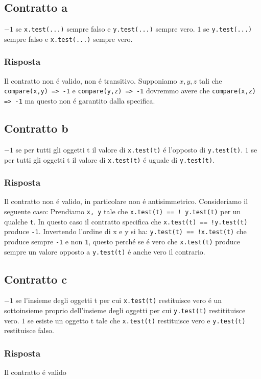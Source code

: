 \documentclass[11pt]{article}
\begin{document}
\subsection{Contratto a}
\label{sec:org3b5a414}
\(-1\) se \texttt{x.test(...)} sempre falso e \texttt{y.test(...)} sempre vero.
\(1\) se \texttt{y.test(...)} sempre falso e \texttt{x.test(...)} sempre vero.
\subsubsection{Risposta}
\label{sec:org29077a0}
Il contratto non é valido, non é transitivo.
Supponiamo \(x,y,z\) tali che \texttt{compare(x,y) => -1} e \texttt{compare(y,z) => -1} dovremmo avere che \texttt{compare(x,z) => -1} ma questo non é garantito dalla specifica.
\subsection{Contratto b}
\label{sec:org5584f2e}
\(-1\) se per tutti gli oggetti t il valore di  \texttt{x.test(t)} é l'opposto di \texttt{y.test(t)}.
\(1\) se per tutti gli oggetti t il valore di  \texttt{x.test(t)} é uguale di \texttt{y.test(t)}.
\subsubsection{Risposta}
\label{sec:orgf2d2477}
Il contratto non é valido, in particolare non é antisimmetrico.
Consideriamo il seguente caso:
Prendiamo \texttt{x, y} tale che \texttt{x.test(t) == ! y.test(t)} per un qualche \texttt{t}.
In questo caso il contratto specifica che \texttt{x.test(t) == !y.test(t)} produce \texttt{-1}.
Invertendo l'ordine di x e y si ha:
\texttt{y.test(t) == !x.test(t)} che produce sempre \texttt{-1} e non \texttt{1}, questo perché se é vero che \texttt{x.test(t)} produce sempre un valore opposto a \texttt{y.test(t)} é anche vero il contrario.
\subsection{Contratto c}
\label{sec:orgde7a16e}
\(-1\) se l'insieme degli oggetti t per cui \texttt{x.test(t)} restituisce vero é un sottoinsieme proprio dell'insieme degli oggetti per cui \texttt{y.test(t)} restitituisce vero.
\(1\) se esiste un oggetto t tale che \texttt{x.test(t)} restituisce vero e \texttt{y.test(t)} restituisce falso.
\subsubsection{Risposta}
\label{sec:org9be0948}
Il contratto é valido
\end{document}
